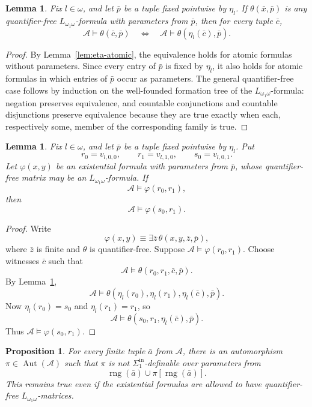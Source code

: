 \documentclass[12pt]{article}
\newtheorem{proposition}[theorem]{Proposition}
\newtheorem{lemma}[theorem]{Lemma}
\theoremstyle{definition}
\theoremstyle{remark}
\newcommand{\Aut}{\operatorname{Aut}}
\newcommand{\rng}{\operatorname{rng}}
\begin{document}
\begin{lemma}\label{lem:eta-qf}
Fix \(l\in\omega\), and let \(\bar p\) be a tuple fixed pointwise by \(\eta_l\).  If \(\theta(\bar x,\bar p)\) is any quantifier-free \(L_{\omega_1\omega}\)-formula with parameters from \(\bar p\), then for every tuple \(\bar c\),
\[
\mathcal A\models \theta(\bar c,\bar p)
\quad\Longleftrightarrow\quad
\mathcal A\models \theta(\eta_l(\bar c),\bar p).
\]
\end{lemma}

\begin{proof}
By Lemma~\ref{lem:eta-atomic}, the equivalence holds for atomic formulas without parameters.  Since every entry of \(\bar p\) is fixed by \(\eta_l\), it also holds for atomic formulas in which entries of \(\bar p\) occur as parameters.  The general quantifier-free case follows by induction on the well-founded formation tree of the \(L_{\omega_1\omega}\)-formula: negation preserves equivalence, and countable conjunctions and countable disjunctions preserve equivalence because they are true exactly when each, respectively some, member of the corresponding family is true.
\end{proof}

\begin{lemma}\label{lem:existential-transfer}
Fix \(l\in\omega\), and let \(\bar p\) be a tuple fixed pointwise by \(\eta_l\).  Put
\[
r_0=v_{l,0,0},\qquad r_1=v_{l,1,0},\qquad s_0=v_{l,0,1}.
\]
Let \(\varphi(x,y)\) be an existential formula with parameters from \(\bar p\), whose quantifier-free matrix may be an \(L_{\omega_1\omega}\)-formula.  If
\[
\mathcal A\models \varphi(r_0,r_1),
\]
then
\[
\mathcal A\models \varphi(s_0,r_1).
\]
\end{lemma}

\begin{proof}
Write
\[
\varphi(x,y)\equiv \exists \bar z\,\theta(x,y,\bar z,\bar p),
\]
where \(\bar z\) is finite and \(\theta\) is quantifier-free.  Suppose \(\mathcal A\models\varphi(r_0,r_1)\).  Choose witnesses \(\bar c\) such that
\[
\mathcal A\models \theta(r_0,r_1,\bar c,\bar p).
\]
By Lemma~\ref{lem:eta-qf},
\[
\mathcal A\models \theta(\eta_l(r_0),\eta_l(r_1),\eta_l(\bar c),\bar p).
\]
Now \(\eta_l(r_0)=s_0\) and \(\eta_l(r_1)=r_1\), so
\[
\mathcal A\models \theta(s_0,r_1,\eta_l(\bar c),\bar p).
\]
Thus \(\mathcal A\models\varphi(s_0,r_1)\).
\end{proof}

\begin{proposition}\label{prop:nondef}
For every finite tuple \(\bar a\) from \(\mathcal A\), there is an automorphism \(\pi\in\Aut(\mathcal A)\) such that \(\pi\) is not \(\Sigma^{\mathrm{in}}_1\)-definable over parameters from
\[
\rng(\bar a)\cup \pi[\rng(\bar a)].
\]
This remains true even if the existential formulas are allowed to have quantifier-free \(L_{\omega_1\omega}\)-matrices.
\end{proposition}
\end{document}
